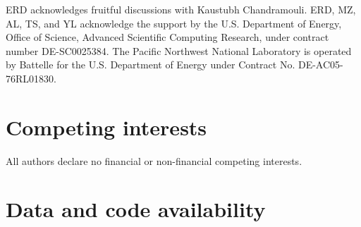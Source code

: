 \documentclass{article}
\begin{document}
ERD acknowledges fruitful discussions with Kaustubh Chandramouli. ERD, MZ, AL, TS, and YL acknowledge the support by the U.S. Department of Energy, Office of Science, Advanced Scientific Computing Research, under contract number DE-SC0025384. The Pacific Northwest National Laboratory is operated by Battelle for the U.S. Department of
Energy under Contract No. DE-AC05-76RL01830.


\section{Competing interests}
All authors declare no financial or non-financial competing interests. 




\section{Data and code availability}









\appendix

\end{document}
